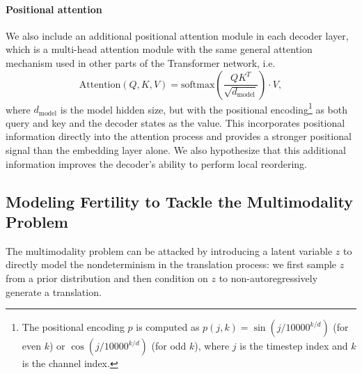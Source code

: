 \vspace{-5pt}
\paragraph{Positional attention}
We also include an additional positional attention module in each decoder layer, which is a multi-head attention module with the same general attention mechanism used in other parts of the Transformer network, i.e.
\begin{equation}
\text{Attention}(Q,K,V)=\text{softmax}\left(\frac{QK^T}{\sqrt{d_\text{model}}}\right)\cdot V,
\label{eq.attention}
\end{equation}
where $d_\text{model}$ is the model hidden size, but with the positional encoding\footnote{The positional encoding $p$ is computed as $p(j, k) =
\sin{(j/10000^{k/d})}$ (for even $k$) or $\cos{(j/10000^{k/d})}$ (for odd $k$), where $j$ is the timestep index and $k$ is the channel index.} as both query and key and the decoder states as the value. This incorporates positional information directly into the attention process and provides a stronger positional signal than the embedding layer alone. We also hypothesize that this additional information improves the decoder's ability to perform local reordering.

\subsection{Modeling Fertility to Tackle the Multimodality Problem}
\label{sec.fertility}

The multimodality problem can be attacked by introducing a latent variable $z$ to directly model the nondeterminism in the translation process: we first sample $z$ from a prior distribution and then condition on $z$ to non-autoregressively generate a translation.

